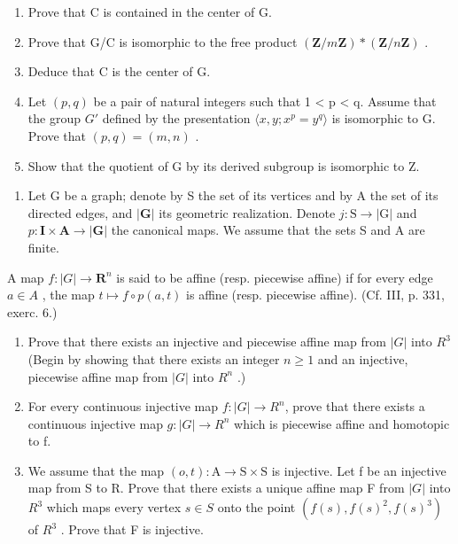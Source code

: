 \begin{enumerate}
\def\labelenumi{\alph{enumi})}
\item
  Prove that C is contained in the center of G.
\item
  Prove that G/C is isomorphic to the free product \((\mathbf{Z}/m\mathbf{Z})*(\mathbf{Z}/n\mathbf{Z})\) .
\item
  Deduce that C is the center of G.
\item
  Let \((p,q)\) be a pair of natural integers such that 1 \textless{} p \textless{} q. Assume that the group \(G'\) defined by the presentation \(\langle x,y; x^{p} = y^{q}\rangle\) is isomorphic to G. Prove that \((p,q) = (m,n)\) .
\item
  Show that the quotient of G by its derived subgroup is isomorphic to Z.
\end{enumerate}

\begin{enumerate}
\def\labelenumi{\arabic{enumi})}
\setcounter{enumi}{18}
\tightlist
\item
  Let G be a graph; denote by S the set of its vertices and by A the set of its directed edges, and \(|\mathbf{G}|\) its geometric realization. Denote \(j\colon \mathrm{S}\to |\mathrm{G}|\) and \(p\colon \mathbf{I}\times \mathbf{A}\to |\mathbf{G}|\) the canonical maps. We assume that the sets S and A are finite.
\end{enumerate}

 A map \(f\colon|G|\to\mathbf{R}^{n}\) is said to be affine (resp. piecewise affine) if for every edge \(a\in A\) , the map \(t\mapsto f\circ p(a,t)\) is affine (resp. piecewise affine). (Cf. III, p. 331, exerc. 6.)

\begin{enumerate}
\def\labelenumi{\alph{enumi})}
\item
   Prove that there exists an injective and piecewise affine map from \(|G|\) into \(R^{3}\) (Begin by showing that there exists an integer \(n \geqslant 1\) and an injective, piecewise affine map from \(|G|\) into \(R^{n}\) .)
\item
   For every continuous injective map \(f\colon|G|\to R^{n}\), prove that there exists a continuous injective map \(g\colon|G|\to R^{n}\) which is piecewise affine and homotopic to f.
\item
   We assume that the map \((o,t)\colon\mathrm{A}\to\mathrm{S}\times\mathrm{S}\) is injective. Let f be an injective map from S to R. Prove that there exists a unique affine map F from \(|G|\) into \(R^{3}\) which maps every vertex \(s\in S\) onto the point \((f(s),f(s)^{2},f(s)^{3})\) of \(R^{3}\) . Prove that F is injective.
\end{enumerate}

